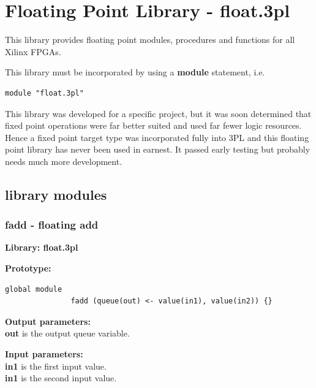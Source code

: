 \pagebreak

\section{Floating Point Library - float.3pl}\label{chap:fp}

    This library provides floating point modules, procedures and functions for
    all Xilinx FPGAs.
    
    This library must be incorporated by using a {\bf module} statement, i.e.
    \begin{lstlisting}[gobble=4, language=threepl]
       module "float.3pl"
    \end{lstlisting}
    
    This library was developed for a specific project, but it was soon determined
    that fixed point operations were far better suited and used far fewer
    logic resources. Hence a fixed point target type was incorporated fully
    into 3PL and this floating point library has never been used in earnest.
    It passed early testing but probably needs much more development.



    \subsection{library modules}


        \subsubsection{fadd - floating add}\label{sec:lmfadd}

            {\bf Library: float.3pl}

            {\bf Prototype:} \\
            \vsp
            \begin{lstlisting}[gobble=12, language=threepl]
               global module
               fadd (queue(out) <- value(in1), value(in2)) {}
            \end{lstlisting}

            {\bf Output parameters:} \\
            {\bf out} is the output queue variable.

            {\bf Input parameters:} \\
            {\bf in1} is the first input value. \\
            {\bf in1} is the second input value.

